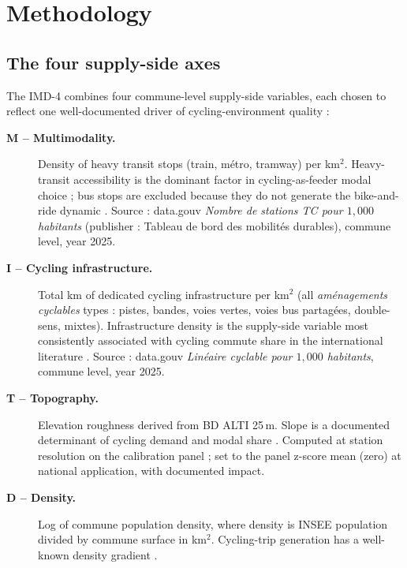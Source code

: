 \documentclass[11pt,a4paper]{article}
\begin{document}
\section{Methodology}
\label{sec:methods}

\subsection{The four supply-side axes}

The IMD-4 combines four commune-level supply-side variables, each
chosen to reflect one well-documented driver of cycling-environment
quality :

\begin{description}
    \item[\textbf{M -- Multimodality.}]  Density of heavy transit
          stops (train, m\'etro, tramway) per km$^2$.  Heavy-transit
          accessibility is the dominant factor in cycling-as-feeder
          modal choice ; bus stops are excluded because they do
          not generate the bike-and-ride dynamic
          \citep{Martens2007,Saberi2018}.
          Source : data.gouv \emph{Nombre de stations TC pour
          $1{,}000$ habitants} (publisher : Tableau de bord des
          mobilit\'es durables), commune level, year 2025.

    \item[\textbf{I -- Cycling infrastructure.}]  Total km of
          dedicated cycling infrastructure per km$^2$ (all
          \emph{am\'enagements cyclables} types : pistes, bandes,
          voies vertes, voies bus partag\'ees, double-sens, mixtes).
          Infrastructure density is the supply-side variable most
          consistently associated with cycling commute share in the
          international literature
          \citep{Schoner2014,Parkin2008,Heinen2010}.
          Source : data.gouv \emph{Lin\'eaire cyclable pour
          $1{,}000$ habitants}, commune level, year 2025.

    \item[\textbf{T -- Topography.}]  Elevation roughness derived
          from BD ALTI 25\,m.  Slope is a documented determinant of
          cycling demand and modal share
          \citep{Parkin2008,Rietveld2004}.
          Computed at station resolution on the calibration
          panel ; set to the panel z-score mean (zero) at national
          application, with documented impact.

    \item[\textbf{D -- Density.}]  Log of commune population density,
          where density is INSEE population divided by commune
          surface in km$^2$.  Cycling-trip generation has a well-known
          density gradient \citep{FaghihImani2014,Rietveld2004}.
\end{description}
\end{document}
